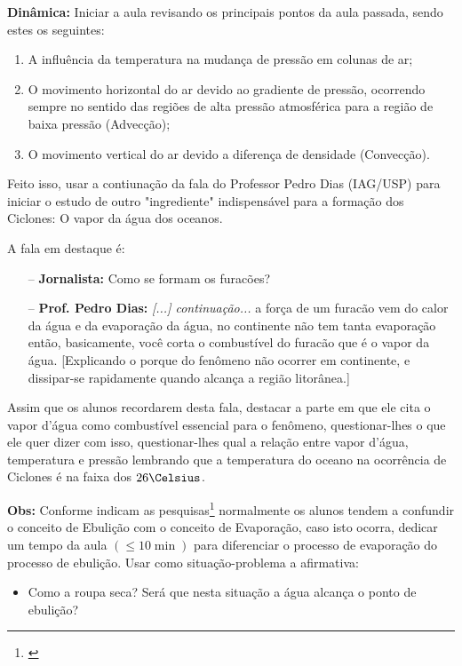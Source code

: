 \documentclass[
12pt,				%
openright,			%
oneside,			%
a4paper,			%
chapter=TITLE,		%
english,			%
brazil				%
]{abntex2}
\begin{document}
\noindent\textbf{Dinâmica:} Iniciar a aula revisando os principais pontos da aula passada, sendo estes os seguintes:
\begin{enumerate}[label=\alph *)]
		\item A influência da temperatura na mudança de pressão em colunas de ar;
		\item O movimento horizontal do ar devido ao gradiente de pressão, ocorrendo sempre no sentido das regiões de alta pressão atmosférica para a região de baixa pressão (Advecção);
		\item O movimento vertical do ar devido a diferença de densidade (Convecção). 
\end{enumerate}

Feito isso, usar a contiunação da fala do Professor Pedro Dias (IAG/USP) para iniciar o estudo de outro "ingrediente" indispensável para a formação dos Ciclones: O vapor da água dos oceanos.

A fala em destaque é:

\begin{itemize}
	\item[--] \textbf{Jornalista:} Como se formam os furacões?
	\item[--] \textbf{Prof. Pedro Dias:} \textit{[...] continuação...} a força de um furacão vem do calor da água e da evaporação da água, no continente não tem tanta evaporação então, basicamente, você corta o combustível do furacão que é o vapor da água. [Explicando o porque do fenômeno não ocorrer em continente, e dissipar-se rapidamente quando alcança a região litorânea.]
\end{itemize}

Assim que os alunos recordarem desta fala, destacar a parte em que ele cita o vapor d'água como combustível essencial para o fenômeno, questionar-lhes o que ele quer dizer com isso, questionar-lhes qual a relação entre vapor d'água, temperatura e pressão lembrando que a temperatura do oceano na ocorrência de Ciclones é na faixa dos $26\Celsius$.

\noindent\textbf{Obs:} Conforme indicam as pesquisas\footnote{\cite{LANG:2016}} normalmente os alunos tendem a confundir o conceito de Ebulição com o conceito de Evaporação, caso isto ocorra, dedicar um tempo da aula $(\leq 10\min)$ para diferenciar o processo de evaporação do processo de ebulição. Usar como situação-problema a afirmativa:

\begin{itemize}
		\item Como a roupa seca? Será que nesta situação a água alcança o ponto de ebulição?
\end{itemize}
\end{document}
